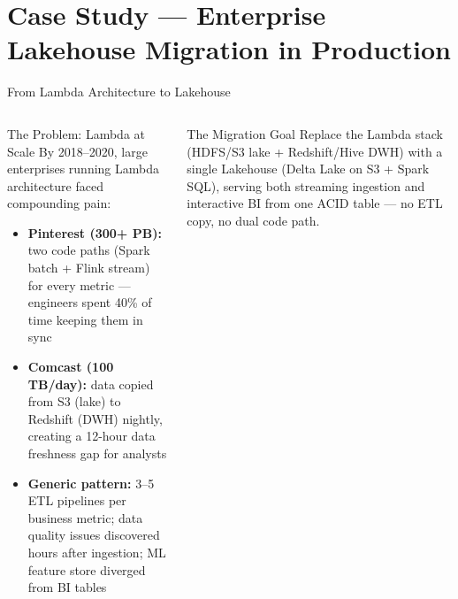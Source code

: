 \documentclass[aspectratio=169,10pt]{beamer}
\begin{document}
\section{Case Study — Enterprise Lakehouse Migration in Production}

\begin{frame}{From Lambda Architecture to Lakehouse}
  \begin{columns}[T]
      \begin{block}{The Problem: Lambda at Scale}
        By 2018--2020, large enterprises running Lambda architecture
        faced compounding pain:
        \begin{itemize}
          \item \textbf{Pinterest (300+ PB):}
                two code paths (Spark batch + Flink stream) for
                every metric — engineers spent 40\% of time keeping
                them in sync
          \item \textbf{Comcast (100 TB/day):}
                data copied from S3 (lake) to Redshift (DWH) nightly,
                creating a 12-hour data freshness gap for analysts
          \item \textbf{Generic pattern:}
                3--5 ETL pipelines per business metric;
                data quality issues discovered hours after ingestion;
                ML feature store diverged from BI tables
        \end{itemize}
      \end{block}
      \vspace{4pt}
      \begin{alertblock}{The Migration Goal}
        Replace the Lambda stack (HDFS/S3 lake + Redshift/Hive DWH)
        with a single Lakehouse (Delta Lake on S3 + Spark SQL),
        serving both streaming ingestion and interactive BI from
        one ACID table — no ETL copy, no dual code path.
      \end{alertblock}


\end{columns}
\end{frame}
\end{document}
